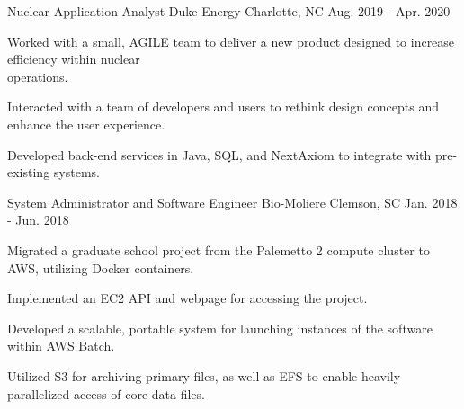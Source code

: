 \begin{cventries}
  \cventry
    {Nuclear Application Analyst}
    {Duke Energy}
    {Charlotte, NC}
    {Aug. 2019 - Apr. 2020}
    {
        \begin{cvitems}
            \item {Worked with a small, AGILE team to deliver a new product designed to increase efficiency within nuclear \\operations.}
            \item {Interacted with a team of developers and users to rethink design concepts and enhance the user experience.}
            \item {Developed back-end services in Java, SQL, and NextAxiom to integrate with pre-existing systems.}
        \end{cvitems}
    }
    
  \cventry
    {System Administrator and Software Engineer}
    {Bio-Moliere}
    {Clemson, SC}
    {Jan. 2018 - Jun. 2018}
    {
      \begin{cvitems}
        \item {Migrated a graduate school project from the Palemetto 2 compute cluster to AWS, utilizing Docker containers.}
        \item {Implemented an EC2 API and webpage for accessing the project.}
        \item {Developed a scalable, portable system for launching instances of the software within AWS Batch.}
        \item {Utilized S3 for archiving primary files, as well as EFS to enable heavily parallelized access of core data files.}
      \end{cvitems}
    }

\end{cventries}
